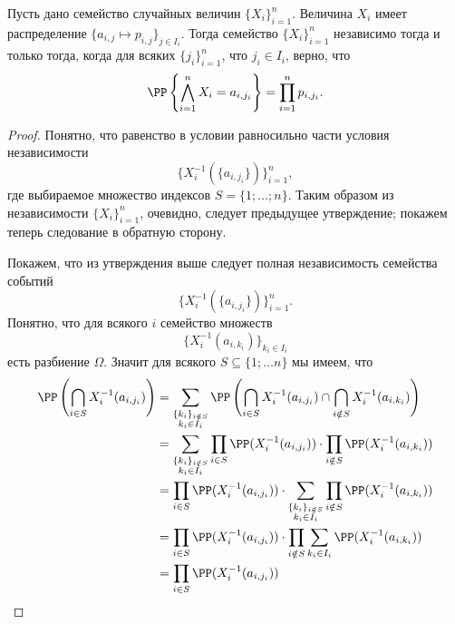 \documentclass[12pt,a4paper]{article}
\begin{document}
    \begin{theorem}
        Пусть дано семейство случайных величин $\{X_i\}_{i=1}^n$. Величина $X_i$ имеет распределение $\{a_{i, j} \mapsto p_{i, j}\}_{j \in I_i}$. Тогда семейство $\{X_i\}_{i=1}^n$ независимо тогда и только тогда, когда для всяких $\{j_i\}_{i = 1}^n$, что $j_i \in I_i$, верно, что
        \[\PP\left\{\bigwedge_{i=1}^n X_i = a_{i, j_i}\right\} = \prod_{i=1}^n p_{i, j_i}.\]
    \end{theorem}

    \begin{proof}
        Понятно, что равенство в условии равносильно части условия независимости
        \[\{X_i^{-1}(\{a_{i, j_i}\})\}_{i=1}^n,\]
        где выбираемое множество индексов $S = \{1; \dots; n\}$. Таким образом из независимости $\{X_i\}_{i=1}^n$, очевидно, следует предыдущее утверждение; покажем теперь следование в обратную сторону.

        Покажем, что из утверждения выше следует полная независимость семейства событий
        \[\{X_i^{-1}(\{a_{i, j_i}\})\}_{i=1}^n.\]
        Понятно, что для всякого $i$ семейство множеств
        \[\{X_i^{-1}(a_{i, k_i})\}_{k_i \in I_i}\]
        есть разбиение $\Omega$. Значит для всякого $S \subseteq \{1; \dots n\}$ мы имеем, что
        \begin{align*}
            \PP\left(\bigcap_{i \in S} X_i^{-1}(a_{i, j_i})\right)
            &= \sum_{\substack{\{k_i\}_{i \notin S}\\ k_i \in I_i}} \PP\left(\bigcap_{i \in S} X_i^{-1}(a_{i, j_i}) \cap \bigcap_{i \notin S} X_i^{-1}(a_{i, k_i})\right)\\
            &= \sum_{\substack{\{k_i\}_{i \notin S}\\ k_i \in I_i}} \prod_{i \in S} \PP(X_i^{-1}(a_{i, j_i})) \cdot \prod_{i \notin S} \PP(X_i^{-1}(a_{i, k_i}))\\
            &= \prod_{i \in S} \PP(X_i^{-1}(a_{i, j_i})) \cdot \sum_{\substack{\{k_i\}_{i \notin S}\\ k_i \in I_i}} \prod_{i \notin S} \PP(X_i^{-1}(a_{i, k_i}))\\
            &= \prod_{i \in S} \PP(X_i^{-1}(a_{i, j_i})) \cdot \prod_{i \notin S} \sum_{k_i \in I_i} \PP(X_i^{-1}(a_{i, k_i}))\\
            &= \prod_{i \in S} \PP(X_i^{-1}(a_{i, j_i}))
        \end{align*}


\end{proof}
\end{document}
